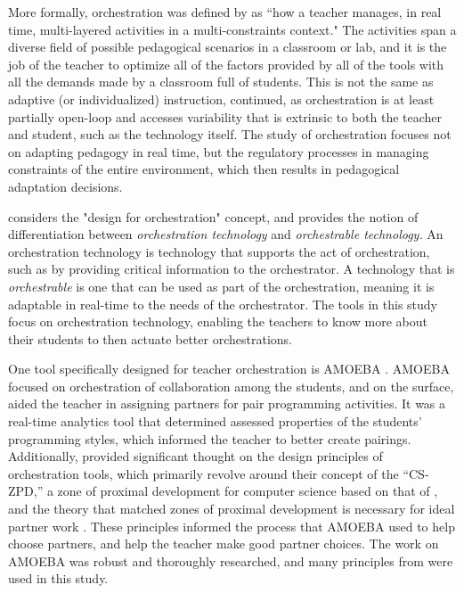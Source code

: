 More formally, orchestration was defined by \citet{dillenbourg2012design} as ``how a teacher manages, in real time, multi-layered activities in a multi-constraints context." The activities span a diverse field of possible pedagogical scenarios in a classroom or lab, and it is the job of the teacher to optimize all of the factors provided by all of the tools with all the demands made by a classroom full of students. This is not the same as adaptive (or individualized) instruction, \citet{dillenbourg2012design} continued, as orchestration is at least partially open-loop and accesses variability that is extrinsic to both the teacher and student, such as the technology itself. The study of orchestration focuses not on adapting pedagogy in real time, but the regulatory processes in managing constraints of the entire environment, which then results in pedagogical adaptation decisions.

\citet{tchounikine2013clarifying} considers the "design for orchestration" concept, and provides the notion of differentiation between \emph{orchestration technology} and \emph{orchestrable technology.} An orchestration technology is technology that supports the act of orchestration, such as by providing critical information to the orchestrator. A technology that is \emph{orchestrable} is one that can be used as part of the orchestration, meaning it is adaptable in real-time to the needs of the orchestrator. The tools in this study focus on orchestration technology, enabling the teachers to know more about their students to then actuate better orchestrations. 

One tool specifically designed for teacher orchestration is AMOEBA \citep{berland2015amoeba}. AMOEBA focused on orchestration of collaboration among the students, and on the surface, aided the teacher in assigning partners for pair programming activities. It was a real-time analytics tool that determined assessed properties of the students' programming styles, which informed the teacher to better create pairings. Additionally, \citeauthor{berland2015amoeba} provided significant thought on the design principles of orchestration tools, which primarily revolve around their concept of the ``CS-ZPD,'' a zone of proximal development for computer science based on that of \citet{vygotsky1987collected}, and the theory that matched zones of proximal development is necessary for ideal partner work \citep{cooper2007effectiveness}. These principles informed the process that AMOEBA used to help choose partners, and help the teacher make good partner choices. The work on AMOEBA \citep{berland2015amoeba}was robust and thoroughly researched, and many principles from were used in this study. 


